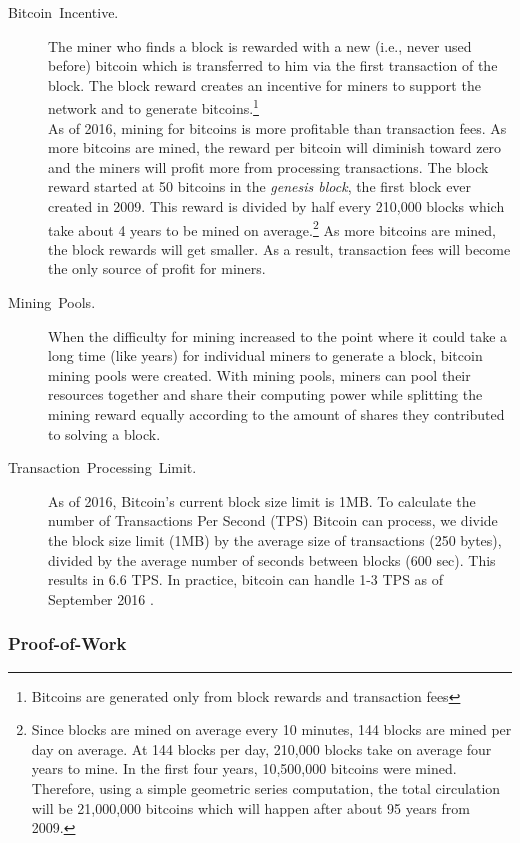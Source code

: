 \documentclass[11pt]{article}
\theoremstyle{plain}
\begin{document}
\begin{description}
	\item [{Bitcoin~Incentive.}] The miner who finds a block is rewarded with
	a new (i.e., never used before) bitcoin which is transferred to him
	via the first transaction of the block. The block reward creates an
	incentive for miners to support the network and to generate bitcoins.\footnote{Bitcoins are generated only from block rewards and transaction fees}\\
	As of 2016, mining for bitcoins is more profitable than transaction
	fees. As more bitcoins are mined, the reward per bitcoin will diminish
	toward zero and the miners will profit more from processing transactions.
	The block reward started at 50 bitcoins in the \emph{genesis block},
	the first block ever created in 2009. This reward is divided by half
	every 210,000 blocks which take about 4 years to be mined on average.\footnote{Since blocks are mined on average every 10 minutes, 144 blocks are
		mined per day on average. At 144 blocks per day, 210,000 blocks take
		on average four years to mine. In the first four years, 10,500,000
		bitcoins were mined. Therefore, using a simple geometric series computation,
		the total circulation will be 21,000,000 bitcoins which will happen
		after about 95 years from 2009. } As more bitcoins are mined, the block rewards will get smaller. As
	a result, transaction fees will become the only source of profit for
	miners.
	\item [{Mining~Pools.}] When the difficulty for mining increased to the
	point where it could take a long time (like years) for individual
	miners to generate a block, bitcoin mining pools were created. With
	mining pools, miners can pool their resources together and share their
	computing power while splitting the mining reward equally according
	to the amount of shares they contributed to solving a block.
	\item [{Transaction~Processing~Limit.}] As of 2016, Bitcoin's current
	block size limit is 1MB. To calculate the number of Transactions Per
	Second (TPS) Bitcoin can process, we divide the block size limit (1MB)
	by the average size of transactions (250 bytes), divided by the average
	number of seconds between blocks (600 sec). This results in 6.6 TPS.
	In practice, bitcoin can handle 1-3 TPS as of September 2016 \cite{Blockchain:TransPerBlock}.
\end{description}

\subsubsection{Proof-of-Work \label{subsec:Proof-of-Work}}
\end{document}
